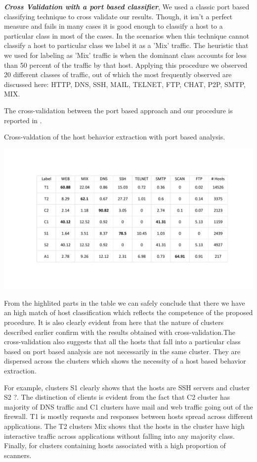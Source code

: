 \textbf{\textit{Cross Validation with a port based classifier}}, We used a classic port based classifying technique to cross validate our results. Though, it isn't a perfect measure and fails in many cases it is good enough to classify a host to a particular class in most of the cases.
In the scenarios when this technique cannot classify a host to particular class we label it as a 'Mix' traffic. The heuristic that we used for labeling as 'Mix' traffic is when the dominant class accounts for less than 50 percent of the traffic by that host. Applying this procedure we observed 20 different classes of traffic, out of which the most frequently observed are discussed here: HTTP, DNS, SSH, MAIL, TELNET, FTP, CHAT, P2P, SMTP, MIX.

The cross-validation between the port based approach and  our procedure is reported in . 

\begin{table}[t]
	\caption{Cross-valdation of the host behavior extraction with port based analysis.}%
	\centerline{\includegraphics[scale = 0.6]{validation.pdf}}	
\end{table}

From the highlited parts in the table we can safely conclude that 
there we have an high match of host classification which reflects the competence of the proposed procedure. It is also clearly evident from here that the nature of clusters described earlier confirm with the results obtained with cross-validation.The cross-validation also suggests that all the hosts that fall into a particular class based on port based analysis are not necessarily in the same cluster. They are dispersed across the clusters which shows the necessity of a host based behavior extraction.

For example, clusters S1 clearly shows that the hosts are SSH servers and cluster S2 ?. The distinction of clients is evident from the fact that C2 cluster has majority of DNS traffic and C1 clusters have mail and web traffic going out of the firewall. T1 is mostly requests and responses between hosts spread across different applications. The T2 clusters Mix shows that the hosts in the cluster have high interactive traffic across applications without falling into any majority class. Finally, for clusters containing hosts associated with a high proportion of scanners.

